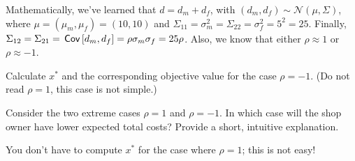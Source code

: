 Mathematically, we've learned that $d = d_m + d_f$, with $(d_m, d_f) \sim \mathcal{N}(\mu, \Sigma)$, where $\mu = (\mu_m, \mu_f) = (10,10)$ and $\Sigma_{11} = \sigma_m^2 = \Sigma_{22}  = \sigma_f^2 = 5^2 = 25$. Finally, $\Sigma_{12} = \Sigma_{21} = \,\mathsf{Cov}\left[d_m, d_f\right] = \rho \sigma_m \sigma_f = 25 \rho$. Also, we know that either $\rho \approx 1$ or $\rho \approx -1$.

\begin{exercise}
 Calculate $x^*$ and the corresponding objective value for the case $\rho = -1$. (Do not read  $\rho=1$, this case is not simple.)
\end{exercise}

\begin{exercise}
Consider the two extreme cases $\rho = 1$ and $\rho = -1$.
In which case will the shop owner have lower expected total costs?
Provide a short, intuitive explanation.
\begin{hint}
You don't have to compute $x^*$ for the case where $\rho = 1$; this is not easy!
\end{hint}
\end{exercise}




